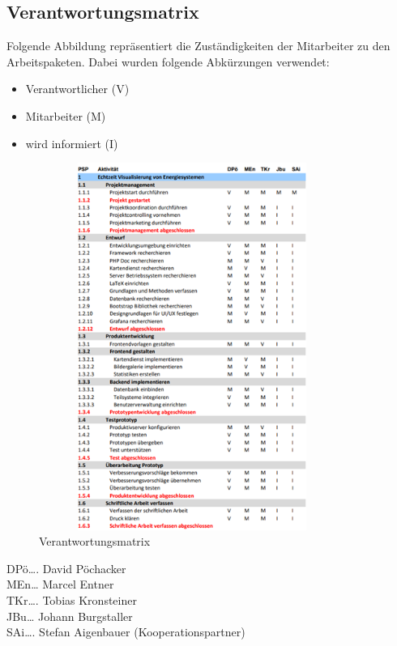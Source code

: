 \subsection{Verantwortungsmatrix}
Folgende Abbildung repräsentiert die Zuständigkeiten der Mitarbeiter zu den Arbeitspaketen.
Dabei wurden folgende Abkürzungen verwendet:
\begin{itemize}
	\item  Verantwortlicher (V)
	\item Mitarbeiter (M)
	\item wird informiert (I)
\end{itemize}

\begin{figure}[h]
	\centering
	\includegraphics[height=12cm,width=10cm]{images/Verantwortungsmatrix}
	\caption{Verantwortungsmatrix}
	\label{fig:Verantwortungsmatrix }
\end{figure}
 DPö…. David Pöchacker \\
 MEn… Marcel Entner \\
 TKr…. Tobias Kronsteiner \\
 JBu… Johann Burgstaller \\
 SAi…. Stefan Aigenbauer (Kooperationspartner) \\

\newpage
